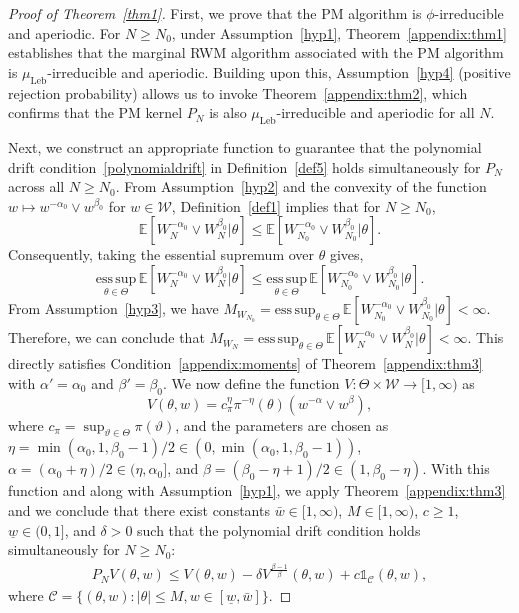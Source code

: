 \documentclass[pdflatex,sn-mathphys-num]{sn-jnl}
\newcommand{\E}{\mathbb{E}}
\newcommand{\ind}{\mathds{1}}
\renewcommand{\geq}{\geqslant}
\renewcommand{\leq}{\leqslant}
\theoremstyle{thmstyleone}
\theoremstyle{thmstyletwo}
\theoremstyle{thmstylethree}
\begin{document}
\begin{figure}[omitted: a diagram of this paper's results, not reproduced here]\label{diagram}\end{figure}

\begin{proof}[Proof of Theorem~{\upshape\ref{thm1}}]
First, we prove that the PM algorithm is $\phi$-irreducible and aperiodic. For $N\geq N_0$, under Assumption~\ref{hyp1}, Theorem~\ref{appendix:thm1} establishes that the marginal RWM algorithm associated with the PM algorithm is $\mu_{\text{Leb}}$-irreducible and aperiodic. Building upon this, Assumption~\ref{hyp4} (positive rejection probability) allows us to invoke Theorem~\ref{appendix:thm2}, which confirms that the PM kernel $P_N$ is also $\mu_{\text{Leb}}$-irreducible and aperiodic for all $N$. 

Next, we construct an appropriate function to guarantee that the polynomial drift condition~\eqref{polynomialdrift} in Definition~\ref{def5} holds simultaneously for $P_N$ across all $N \geq N_0$. From Assumption~\ref{hyp2} and the convexity of the function $w \mapsto w^{-\alpha_{0}} \vee w^{\beta_{0}}$ for $w \in \mathcal{W}$, Definition~\ref{def1} implies that for $N \ge N_0$,
\[
\E[W_N^{-\alpha_{0}} \vee W_N^{\beta_{0}}|\theta]  \leq \E[W_{N_0}^{-\alpha_{0}} \vee W_{N_0}^{\beta_{0}}|\theta].
\]
Consequently, taking the essential supremum over $\theta$ gives,
\[
\underset{\theta \in \Theta}{\mathrm{ess\,sup}}\,  \E[W_N^{-\alpha_{0}} \vee W_N^{\beta_{0}}|\theta]  \leq \underset{\theta \in \Theta}{\mathrm{ess\,sup}}\,  \E[W_{N_0}^{-\alpha_{0}} \vee W_{N_0}^{\beta_{0}}|\theta].
\]
From Assumption~\ref{hyp3}, we have $M_{W_{N_0}}=  {\mathrm{ess\,sup} }_{\theta \in \Theta}\, \E[W_{N_0}^{-\alpha_{0}} \vee W_{N_0}^{\beta_{0}}|\theta] <  \infty$.
Therefore, we can conclude that $M_{W_N} = {\mathrm{ess\,sup} }_{\theta \in \Theta}\,  \E[W_N^{-\alpha_{0}} \vee W_N^{\beta_{0}}|\theta]  < \infty$. This directly satisfies Condition~\eqref{appendix:moments} of Theorem~\ref{appendix:thm3} with $\alpha'=\alpha_{0}$ and $\beta'=\beta_{0}$. We now define the function $V : \Theta \times \mathcal{W} \to [1, \infty)$ as
\[
V(\theta, w) = c_\pi^{\eta}\pi^{-\eta}(\theta) (w^{-\alpha} \vee w^{\beta}),
\]
where $c_\pi ={\sup}_{\vartheta \in \Theta} \pi(\vartheta)$, and the parameters are chosen as $\eta = \min(\alpha_{0},1,\beta_{0}-1)/2 \in (0, \min(\alpha_{0},1,\beta_{0}-1))$, $\alpha = (\alpha_{0}+\eta)/2 \in (\eta, \alpha_{0}]$, and $\beta = (\beta_{0}-\eta+1)/2 \in (1, \beta_{0}-\eta)$. With this function and along with Assumption~\ref{hyp1}, we apply Theorem~\ref{appendix:thm3} and we conclude that there exist constants $\bar{w} \in [1, \infty)$, $M \in [1, \infty)$, $c \geq 1$, $\underline{w} \in (0,1]$, and $\delta>0$ such that the polynomial drift condition holds simultaneously for $N \geq N_0$:
\begin{align}
    P_N V(\theta, w) \leq V(\theta, w) - \delta V^{\frac{\beta-1}{\beta}}(\theta, w) + c\ind_\mathcal{C}(\theta, w),
    \label{polydrift}
\end{align}
where $\mathcal{C} =\{(\theta, w) : |\theta|\leq M, w\in [\underline{w}, \bar{w}]\}$. 



\end{proof}
\end{document}
